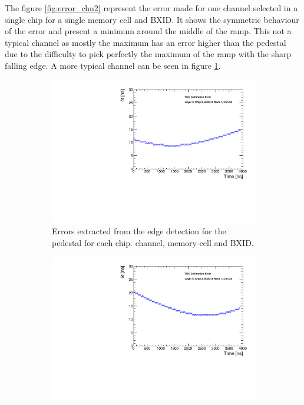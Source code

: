 The figure \ref{fig:error_chn2} represent the error made for one channel selected in a single chip for a single memory cell and BXID. It shows the symmetric behaviour of the error and present a minimum around the middle of the ramp. This not a typical channel as mostly the maximum has an error higher than the pedestal due to the difficulty to pick perfectly the maximum of the ramp with the sharp falling edge. A more typical channel can be seen in figure \ref{fig:error_chn}.

\begin{figure}[htbp!]
	\begin{subfigure}[t]{0.45\textwidth}
		\centering
		\includegraphics[width=1\linewidth]{chap5/fig_AHCAL_timing/Muons/TimeErrorEstimation_Layer3.pdf}
		\caption{Errors extracted from the edge detection for the pedestal for each chip. channel, memory-cell and BXID.} \label{fig:error_chn}
	\end{subfigure}
	\hfill
	\begin{subfigure}[t]{0.45\textwidth}
		\centering
		\includegraphics[width=1\linewidth]{chap5/fig_AHCAL_timing/Muons/TimeErrorEstimation_Layer5.pdf}

\end{subfigure}
\end{figure}
